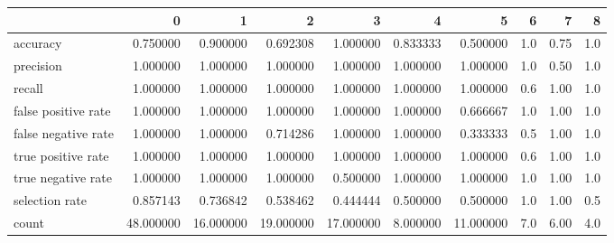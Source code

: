 \begin{tabular}{lrrrrrrrrr}
\toprule
{} &          0 &          1 &          2 &          3 &         4 &          5 &    6 &     7 &    8 \\
\midrule
accuracy            &   0.750000 &   0.900000 &   0.692308 &   1.000000 &  0.833333 &   0.500000 &  1.0 &  0.75 &  1.0 \\
precision           &   1.000000 &   1.000000 &   1.000000 &   1.000000 &  1.000000 &   1.000000 &  1.0 &  0.50 &  1.0 \\
recall              &   1.000000 &   1.000000 &   1.000000 &   1.000000 &  1.000000 &   1.000000 &  0.6 &  1.00 &  1.0 \\
false positive rate &   1.000000 &   1.000000 &   1.000000 &   1.000000 &  1.000000 &   0.666667 &  1.0 &  1.00 &  1.0 \\
false negative rate &   1.000000 &   1.000000 &   0.714286 &   1.000000 &  1.000000 &   0.333333 &  0.5 &  1.00 &  1.0 \\
true positive rate  &   1.000000 &   1.000000 &   1.000000 &   1.000000 &  1.000000 &   1.000000 &  0.6 &  1.00 &  1.0 \\
true negative rate  &   1.000000 &   1.000000 &   1.000000 &   0.500000 &  1.000000 &   1.000000 &  1.0 &  1.00 &  1.0 \\
selection rate      &   0.857143 &   0.736842 &   0.538462 &   0.444444 &  0.500000 &   0.500000 &  1.0 &  1.00 &  0.5 \\
count               &  48.000000 &  16.000000 &  19.000000 &  17.000000 &  8.000000 &  11.000000 &  7.0 &  6.00 &  4.0 \\
\bottomrule
\end{tabular}
